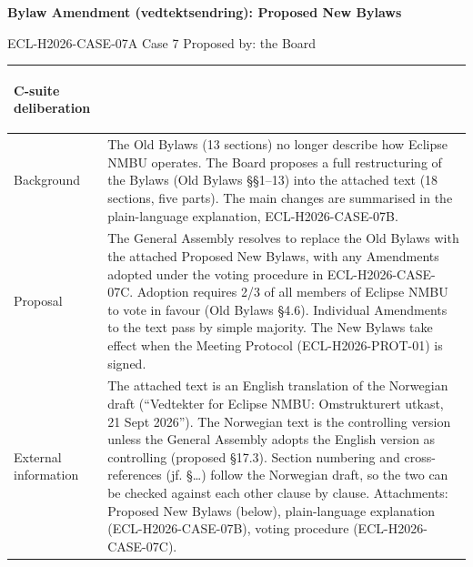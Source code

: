 \documentclass{../../../Common/Latex/Templates/rapport}
\begin{document}
\reportmainmatter
\begingroup
\small
\setlength{\parindent}{0pt}
\setlength{\tabcolsep}{6pt}
\renewcommand{\arraystretch}{1.2}

\begin{center}
  {\Large\bfseries Bylaw Amendment (vedtektsendring): Proposed New Bylaws}\par
  \vspace{0.15cm}
  {\normalsize ECL-H2026-CASE-07A \textperiodcentered{} Case 7 \textperiodcentered{} Proposed by: the Board}\par
  \vspace{0.1cm}
  {\small \meetingline}\par
\end{center}

\vspace{0.3cm}
\begin{tabularx}{\textwidth}{|>{\bfseries\raggedright\arraybackslash}p{4.2cm}|X|}
  \hline
  C-suite deliberation & \rule{0pt}{4.1cm} \\
  \hline
  Background           & The Old Bylaws (13 sections) no longer describe how Eclipse NMBU operates. The Board proposes a full restructuring of the Bylaws (Old Bylaws \S\S1--13) into the attached text (18 sections, five parts). The main changes are summarised in the plain-language explanation, ECL-H2026-CASE-07B. \\
  \hline
  Proposal             & The General Assembly resolves to replace the Old Bylaws with the attached Proposed New Bylaws, with any Amendments adopted under the voting procedure in ECL-H2026-CASE-07C. Adoption requires 2/3 of all members of Eclipse NMBU to vote in favour (Old Bylaws \S4.6). Individual Amendments to the text pass by simple majority. The New Bylaws take effect when the Meeting Protocol (ECL-H2026-PROT-01) is signed. \\
  \hline
  External information & The attached text is an English translation of the Norwegian draft (``Vedtekter for Eclipse NMBU: Omstrukturert utkast, 21 Sept 2026''). The Norwegian text is the controlling version unless the General Assembly adopts the English version as controlling (proposed \S17.3). Section numbering and cross-references (jf. \S\ldots) follow the Norwegian draft, so the two can be checked against each other clause by clause. Attachments: Proposed New Bylaws (below), plain-language explanation (ECL-H2026-CASE-07B), voting procedure (ECL-H2026-CASE-07C). \\
  \hline
\end{tabularx}
\endgroup
\end{document}
